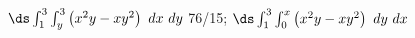 {$\ds \int_{1}^{3}\int_{y}^{3}\left(x^2y-xy^2\right)\ dx\ dy$
}
{76/15; $\ds \int_{1}^{3}\int_{0}^{x}\left(x^2y-xy^2\right)\ dy\ dx$
}